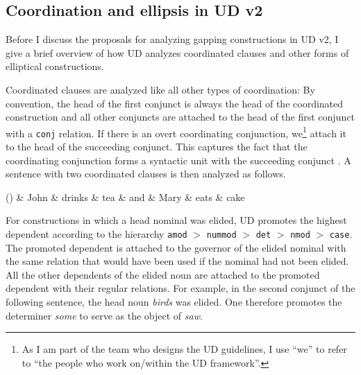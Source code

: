 \documentclass[lucida,biblatex]{sp} %
\newcounter{excounter}
\begin{document}
% 
%


\subsection{Coordination and ellipsis in UD v2}

Before I discuss the proposals for analyzing gapping constructions in UD v2, 
I give a brief overview of how UD analyzes coordinated clauses and 
other forms of elliptical constructions.

Coordinated clauses are analyzed like all other types of coordination:
By convention, the head of the first conjunct is always the head of the 
coordinated construction and all other conjuncts are attached to the head 
of the first conjunct with a \texttt{conj} relation. If there is an overt 
coordinating conjunction, we\footnote{As I am part of the team who designs the UD guidelines, I use ``we'' to refer to ``the people who work on/within the UD framework''.} attach it to the head of the succeeding 
conjunct. This captures the fact that the coordinating 
conjunction forms a syntactic unit with the succeeding conjunct 
\citep{Ross1967,Gerdes2015}. A sentence with two coordinated clauses is then 
analyzed as follows.

\begin{center}
  \label{ex:coord}
  \footnotesize
  \begin{dependency}
    \begin{deptext}[column sep=0.2cm]
      (\theexcounter) 
      \& John \& drinks \& tea \& and \& Mary \& eats \& cake \\
    \end{deptext}
  \end{dependency}
\end{center}

For constructions in which a head nominal was elided, UD promotes the highest
 dependent according to the hierarchy \texttt{amod} $>$ \texttt{nummod} $>$ \texttt{det} 
 $>$ \texttt{nmod} $>$ \texttt{case}. The promoted dependent is attached to the governor 
 of the elided nominal with the same relation that would have been used if the nominal 
 had not been elided. All the other dependents of the elided noun are attached to the 
 promoted dependent with their regular relations. For example, in the second conjunct 
 of the following sentence, the head noun \textit{birds} was elided. One therefore promotes 
 the determiner \textit{some} to serve as the object of \textit{saw}.
\end{document}
